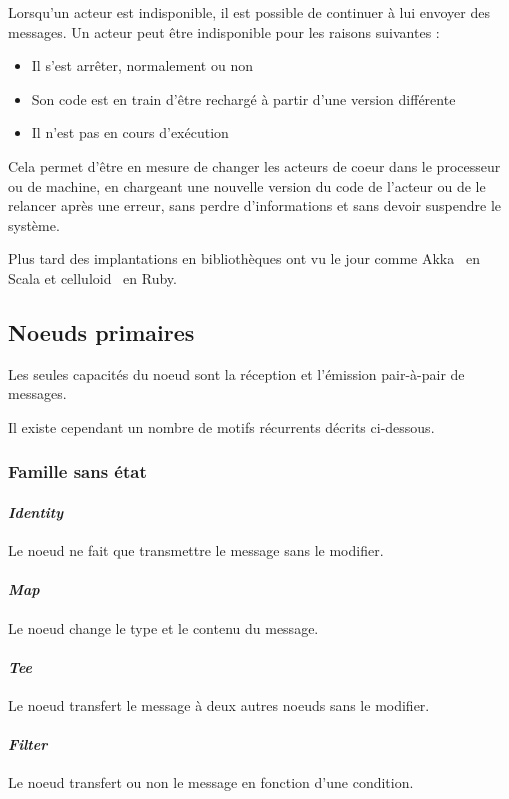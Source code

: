 \documentclass{article}
\begin{document}
Lorsqu'un acteur est indisponible, il est possible de continuer à lui envoyer
des messages.
Un acteur peut être indisponible pour les raisons suivantes :
\begin{itemize}
    \item Il s'est arrêter, normalement ou non
    \item Son code est en train d'être rechargé à partir d'une version différente
    \item Il n'est pas en cours d'exécution
\end{itemize}

Cela permet d'être en mesure de changer les acteurs de coeur dans le processeur ou
de machine, en chargeant une nouvelle version du code de l'acteur ou de le relancer
après une erreur, sans perdre d'informations et sans devoir suspendre le système.

Plus tard des implantations en bibliothèques ont vu le jour comme Akka~\cite{akka}
en Scala et celluloid~\cite{celluloid} en Ruby.

\subsection{Noeuds primaires}
Les seules capacités du noeud sont la réception et l'émission pair-à-pair de messages.

Il existe cependant un nombre de motifs récurrents décrits ci-dessous.

\subsubsection{Famille sans état}
\paragraph{\emph{Identity}}
Le noeud ne fait que transmettre le message sans le modifier.

\paragraph{\emph{Map}}
Le noeud change le type et le contenu du message.

\paragraph{\emph{Tee}}
Le noeud transfert le message à deux autres noeuds sans le modifier.

\paragraph{\emph{Filter}}
Le noeud transfert ou non le message en fonction d'une condition.
\end{document}
